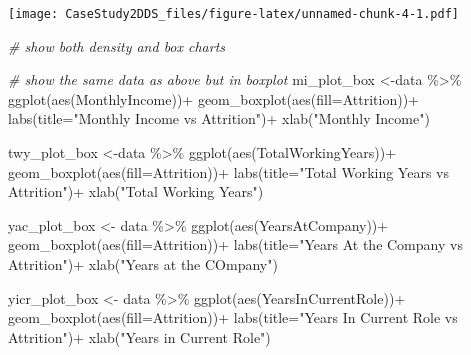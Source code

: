 \documentclass[
]{article}
\newenvironment{Shaded}{\begin{snugshade}}{\end{snugshade}}
\newcommand{\AttributeTok}[1]{\textcolor[rgb]{0.77,0.63,0.00}{#1}}
\newcommand{\CommentTok}[1]{\textcolor[rgb]{0.56,0.35,0.01}{\textit{#1}}}
\newcommand{\FunctionTok}[1]{\textcolor[rgb]{0.00,0.00,0.00}{#1}}
\newcommand{\NormalTok}[1]{#1}
\newcommand{\OtherTok}[1]{\textcolor[rgb]{0.56,0.35,0.01}{#1}}
\newcommand{\SpecialCharTok}[1]{\textcolor[rgb]{0.00,0.00,0.00}{#1}}
\newcommand{\StringTok}[1]{\textcolor[rgb]{0.31,0.60,0.02}{#1}}
\begin{document}
\texttt{[image: CaseStudy2DDS\_files/figure-latex/unnamed-chunk-4-1.pdf]}

\begin{Shaded}
\begin{Highlighting}[]
\CommentTok{\# show both density and box charts}
\end{Highlighting}
\end{Shaded}

\begin{Shaded}
\begin{Highlighting}[]
\CommentTok{\# show the same data as above but in boxplot}
\NormalTok{mi\_plot\_box }\OtherTok{\textless{}{-}}\NormalTok{data }\SpecialCharTok{\%\textgreater{}\%} \FunctionTok{ggplot}\NormalTok{(}\FunctionTok{aes}\NormalTok{(MonthlyIncome))}\SpecialCharTok{+}
  \FunctionTok{geom\_boxplot}\NormalTok{(}\FunctionTok{aes}\NormalTok{(}\AttributeTok{fill=}\NormalTok{Attrition))}\SpecialCharTok{+}
  \FunctionTok{labs}\NormalTok{(}\AttributeTok{title=}\StringTok{"Monthly Income vs Attrition"}\NormalTok{)}\SpecialCharTok{+}
  \FunctionTok{xlab}\NormalTok{(}\StringTok{"Monthly Income"}\NormalTok{)}

\NormalTok{twy\_plot\_box }\OtherTok{\textless{}{-}}\NormalTok{data }\SpecialCharTok{\%\textgreater{}\%} \FunctionTok{ggplot}\NormalTok{(}\FunctionTok{aes}\NormalTok{(TotalWorkingYears))}\SpecialCharTok{+}
  \FunctionTok{geom\_boxplot}\NormalTok{(}\FunctionTok{aes}\NormalTok{(}\AttributeTok{fill=}\NormalTok{Attrition))}\SpecialCharTok{+}
  \FunctionTok{labs}\NormalTok{(}\AttributeTok{title=}\StringTok{"Total Working Years vs Attrition"}\NormalTok{)}\SpecialCharTok{+}
  \FunctionTok{xlab}\NormalTok{(}\StringTok{"Total Working Years"}\NormalTok{)}

\NormalTok{yac\_plot\_box }\OtherTok{\textless{}{-}}\NormalTok{ data }\SpecialCharTok{\%\textgreater{}\%} \FunctionTok{ggplot}\NormalTok{(}\FunctionTok{aes}\NormalTok{(YearsAtCompany))}\SpecialCharTok{+}
  \FunctionTok{geom\_boxplot}\NormalTok{(}\FunctionTok{aes}\NormalTok{(}\AttributeTok{fill=}\NormalTok{Attrition))}\SpecialCharTok{+}
  \FunctionTok{labs}\NormalTok{(}\AttributeTok{title=}\StringTok{"Years At the Company vs Attrition"}\NormalTok{)}\SpecialCharTok{+}
  \FunctionTok{xlab}\NormalTok{(}\StringTok{"Years at the COmpany"}\NormalTok{)}

\NormalTok{yicr\_plot\_box }\OtherTok{\textless{}{-}}\NormalTok{ data }\SpecialCharTok{\%\textgreater{}\%} \FunctionTok{ggplot}\NormalTok{(}\FunctionTok{aes}\NormalTok{(YearsInCurrentRole))}\SpecialCharTok{+}
  \FunctionTok{geom\_boxplot}\NormalTok{(}\FunctionTok{aes}\NormalTok{(}\AttributeTok{fill=}\NormalTok{Attrition))}\SpecialCharTok{+}
  \FunctionTok{labs}\NormalTok{(}\AttributeTok{title=}\StringTok{"Years In Current Role vs Attrition"}\NormalTok{)}\SpecialCharTok{+}
  \FunctionTok{xlab}\NormalTok{(}\StringTok{"Years in Current Role"}\NormalTok{)}


\end{Highlighting}
\end{Shaded}
\end{document}
